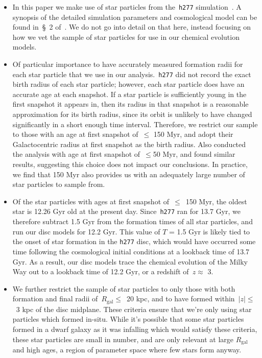 \documentclass[fleqn, usenatbib]{mnras}
\begin{document}
\begin{itemize} 
	\item In this paper we make use of star particles from the~\texttt{h277} 
	simulation~\citep{Christensen2012, Zolotov2012, Loebman2012, Loebman2014, 
	Brooks2014}. A synopsis of the detailed simulation parameters and 
	cosmological model can be found in~\S~2 of~\citet{Bird2020}. We do not 
	go into detail on that here, instead focusing on how we vet the sample of 
	star particles for use in our chemical evolution models. 

	\item Of particular importance to have accurately measured formation radii 
	for each star particle that we use in our analysis.~\texttt{h277} did not 
	record the exact birth radius of each star particle; however, each star 
	particle does have an accurate age at each snapshot. If a star particle 
	is sufficiently young in the first snapshot it appears in, then its 
	radius in that snapshot is a reasonable approximation for its birth 
	radius, since its orbit is unlikely to have changed significantly in a 
	short enough time interval. Therefore, we restrict our sample to those 
	with an age at first snapshot of~$\leq$ 150 Myr, and adopt their 
	Galactocentric radius at first snapshot as the birth radius. Also 
	conducted the analysis with age at first snapshot of~$\leq$50 Myr, and 
	found similar results, suggesting this choice does not impact our 
	conclusions. In practice, we find that 150 Myr also provides us with an 
	adequately large number of star particles to sample from. 

	\item Of the star particles with ages at first snapshot of~$\leq$~150 Myr, 
	the oldest star is 12.26 Gyr old at the present day. Since~\texttt{h277} 
	ran for 13.7 Gyr, we therefore subtract 1.5 Gyr from the formation times of 
	all star particles, and run our disc models for 12.2 Gyr. This value of 
	$T$ = 1.5 Gyr is likely tied to the onset of star formation in the 
	\texttt{h277} disc, which would have occurred some time following the 
	cosmological initial conditions at a lookback time of 13.7 Gyr. As a result, 
	our disc models trace the chemical evolution of the Milky Way out to a 
	lookback time of 12.2 Gyr, or a redshift of~$z \approx$ 3. 

	\item We further restrict the sample of star particles to only those with 
	both formation and final radii of~$R_\text{gal} \leq$~20 kpc, and to have 
	formed within~$\left|z\right|\leq$~3 kpc of the disc midplane. These 
	criteria ensure that we're only using star particles which formed in-situ. 
	While it's possible that some star particles formed in a dwarf galaxy as it 
	was infalling which would satisfy these criteria, these star particles 
	are small in number, and are only relevant at large $R_\text{gal}$ and high 
	ages, a region of parameter space where few stars form anyway. 


\end{itemize}
\end{document}
